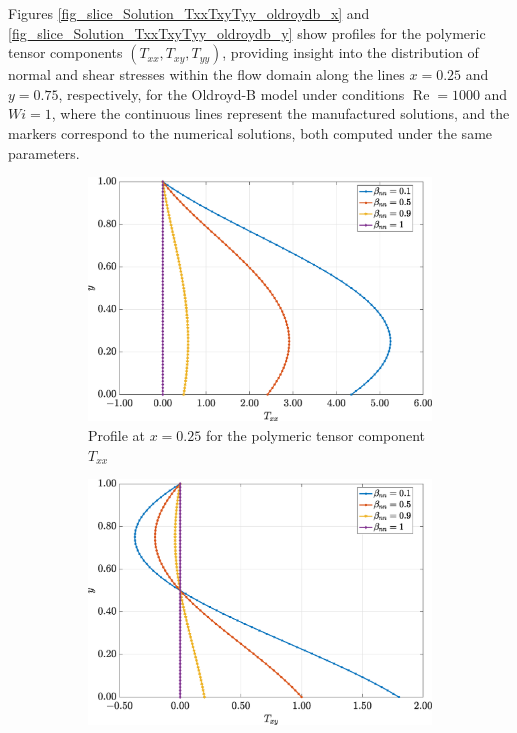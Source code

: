 \documentclass[preprint, 12pt]{elsarticle}
\begin{document}
Figures \ref{fig_slice_Solution_TxxTxyTyy_oldroydb_x} and \ref{fig_slice_Solution_TxxTxyTyy_oldroydb_y} show profiles for the polymeric tensor components $(T_{xx}, T_{xy}, T_{yy})$, providing insight into the distribution of normal and shear stresses within the flow domain along the lines $x=0.25$ and $y=0.75$, respectively, for the Oldroyd-B model under conditions $\operatorname{Re}=1000$ and \mbox{$Wi=1$}, where the continuous lines represent the manufactured solutions, and the markers correspond to the numerical solutions, both computed under the same parameters.
\begin{figure}[H]
    \centering  
    \begin{subfigure}[b]{.46\textwidth}
        \includegraphics[width=\textwidth]{Slice_x_Tog_Numerical_NormErr_2nd_Betann_1_Re_1000_Wi_1_epsilon_0_xi_0_alphaG_0_Dt_1e-06_at_0.05_tipsim_1_MMS_12_x0.25y0.25_Txx.eps}
        \caption{Profile at $x=0.25$ for the polymeric tensor component $T_{xx}$}
        \label{fig_slice_x_txx_2nd_Case1_oldroydB}
    \end{subfigure}
    \vspace{0.2cm}
    \qquad
    \begin{subfigure}[b]{.46\textwidth}
        \includegraphics[width=\textwidth]{Slice_x_Tog_Numerical_NormErr_2nd_Betann_1_Re_1000_Wi_1_epsilon_0_xi_0_alphaG_0_Dt_1e-06_at_0.05_tipsim_1_MMS_12_x0.25y0.25_Txy.eps}

\end{subfigure}
\end{figure}
\end{document}
